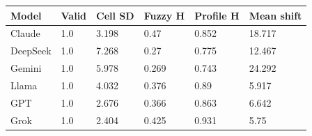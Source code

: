 \begin{tabular}{llllll}
\hline
Model & Valid & Cell SD & Fuzzy H & Profile H & Mean shift \\
\hline
Claude & 1.0 & 3.198 & 0.47 & 0.852 & 18.717 \\
DeepSeek & 1.0 & 7.268 & 0.27 & 0.775 & 12.467 \\
Gemini & 1.0 & 5.978 & 0.269 & 0.743 & 24.292 \\
Llama & 1.0 & 4.032 & 0.376 & 0.89 & 5.917 \\
GPT & 1.0 & 2.676 & 0.366 & 0.863 & 6.642 \\
Grok & 1.0 & 2.404 & 0.425 & 0.931 & 5.75 \\
\hline
\end{tabular}
